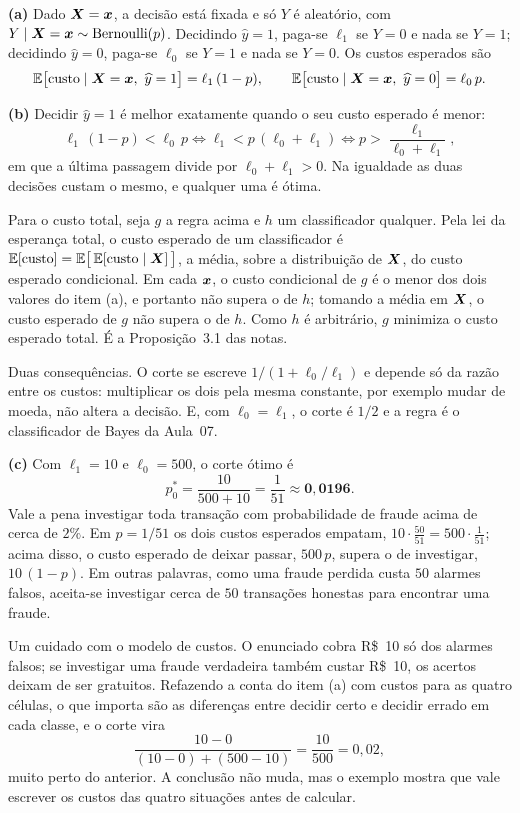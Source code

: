 \documentclass[11pt,a4paper]{article}
\begin{document}
\begin{solucao}
\textbf{(a)} Dado $\bm{X}=\bm{x}$, a decisão está fixada e só $Y$ é aleatório, com
$Y\mid\bm{X}=\bm{x}\sim\text{Bernoulli}(p)$. Decidindo $\widehat y=1$, paga-se $\ell_1$ se
$Y=0$ e nada se $Y=1$; decidindo $\widehat y=0$, paga-se $\ell_0$ se $Y=1$ e nada se
$Y=0$. Os custos esperados são
\[
  \mathbb{E}\big[\text{custo}\mid\bm{X}=\bm{x},\ \widehat y=1\big]=\ell_1\,(1-p),
  \qquad
  \mathbb{E}\big[\text{custo}\mid\bm{X}=\bm{x},\ \widehat y=0\big]=\ell_0\,p .
\]

\smallskip
\textbf{(b)} Decidir $\widehat y=1$ é melhor exatamente quando o seu custo esperado é
menor:
\[
  \ell_1\,(1-p) < \ell_0\,p
  \iff \ell_1 < p\,(\ell_0+\ell_1)
  \iff p > \frac{\ell_1}{\ell_0+\ell_1},
\]
em que a última passagem divide por $\ell_0+\ell_1>0$. Na igualdade as duas decisões
custam o mesmo, e qualquer uma é ótima.

Para o custo total, seja $g$ a regra acima e $h$ um classificador qualquer. Pela lei
da esperança total, o custo esperado de um classificador é
$\mathbb{E}[\text{custo}]=\mathbb{E}\big[\,\mathbb{E}[\text{custo}\mid\bm{X}]\,\big]$, a média, sobre a
distribuição de $\bm{X}$, do custo esperado condicional. Em cada $\bm{x}$, o custo
condicional de $g$ é o menor dos dois valores do item (a), e portanto não supera o de
$h$; tomando a média em $\bm{X}$, o custo esperado de $g$ não supera o de $h$. Como $h$ é
arbitrário, $g$ minimiza o custo esperado total. É a Proposição~3.1 das notas.

Duas consequências. O corte se escreve $1/(1+\ell_0/\ell_1)$ e depende só da razão
entre os custos: multiplicar os dois pela mesma constante, por exemplo mudar de moeda,
não altera a decisão. E, com $\ell_0=\ell_1$, o corte é $1/2$ e a regra é o
classificador de Bayes da Aula~07.

\smallskip
\textbf{(c)} Com $\ell_1=10$ e $\ell_0=500$, o corte ótimo é
\[
  p_0^\ast=\frac{10}{500+10}=\frac{1}{51}\approx\mathbf{0{,}0196}.
\]
Vale a pena investigar toda transação com probabilidade de fraude acima de cerca de
$2\%$. Em $p=1/51$ os dois custos esperados empatam,
$10\cdot\tfrac{50}{51}=500\cdot\tfrac{1}{51}$; acima disso, o custo esperado de deixar
passar, $500\,p$, supera o de investigar, $10\,(1-p)$. Em outras palavras, como uma
fraude perdida custa $50$ alarmes falsos, aceita-se investigar cerca de $50$
transações honestas para encontrar uma fraude.

Um cuidado com o modelo de custos. O enunciado cobra R\$~10 só dos alarmes falsos; se
investigar uma fraude verdadeira também custar R\$~10, os acertos deixam de ser
gratuitos. Refazendo a conta do item (a) com custos para as quatro células, o que
importa são as diferenças entre decidir certo e decidir errado em cada classe, e o
corte vira
\[
  \frac{10-0}{(10-0)+(500-10)}=\frac{10}{500}=0{,}02 ,
\]
muito perto do anterior. A conclusão não muda, mas o exemplo mostra que vale escrever
os custos das quatro situações antes de calcular.


\end{solucao}
\end{document}
